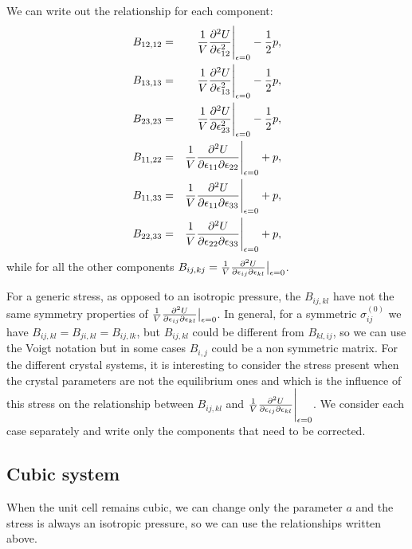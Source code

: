 \documentclass[12pt,a4paper,twoside]{report}
\begin{document}
We can write out the relationship for each component: 
\begin{eqnarray}
B_{12,12} &=& {1 \over V}{\partial^2 U \over \partial \epsilon^2_{12}}\Bigg|_{\epsilon=0} - {1\over 2} p, \\
B_{13,13} &=& {1 \over V}{\partial^2 U \over \partial \epsilon^2_{13} 
}\Bigg|_{\epsilon=0} - {1\over 2} p, \\
B_{23,23} &=& {1 \over V}{\partial^2 U \over \partial \epsilon^2_{23} 
}\Bigg|_{\epsilon=0} - {1\over 2} p, \\
B_{11,22} &=& {1 \over V}{\partial^2 U \over \partial \epsilon_{11} 
\partial \epsilon_{22}}\Bigg|_{\epsilon=0} + p, \\
B_{11,33} &=& {1 \over V}{\partial^2 U \over \partial \epsilon_{11} 
\partial \epsilon_{33}}\Bigg|_{\epsilon=0} + p, \\
B_{22,33} &=& {1 \over V}{\partial^2 U \over \partial \epsilon_{22} 
\partial \epsilon_{33}}\Bigg|_{\epsilon=0} + p, 
\end{eqnarray}
while for all the other components $B_{ij,kj}=
{1 \over V}{\partial^2 U \over \partial \epsilon_{ij} 
\partial \epsilon_{kl}}\big|_{\epsilon=0}$.

For a generic stress, as opposed to an isotropic pressure, the $B_{ij,kl}$ 
have not the same symmetry properties of ${1 \over V}{\partial^2 U \over 
\partial \epsilon_{ij} 
\partial \epsilon_{kl}}\big|_{\epsilon=0}$. In general, for a 
symmetric $\sigma^{(0)}_{ij}$ we have $B_{ij,kl}=B_{ji,kl}=B_{ij,lk}$,
but $B_{ij,kl}$ could be different from $B_{kl,ij}$, so we can use
the Voigt notation but in some cases $B_{i,j}$ could be a non symmetric
matrix.
For the different crystal systems, it is interesting to consider 
the stress present when the crystal parameters are not the equilibrium ones
and which is the influence of this stress on the relationship between 
$B_{ij,kl}$ and 
${1 \over V}{\partial^2 U \over \partial \epsilon_{ij} 
\partial \epsilon_{kl}}\Bigg|_{\epsilon=0}$. We consider each case
separately and write only the components that need to be corrected.

{\color{web-blue}\subsection{Cubic system}}
\color{black}

When the unit cell remains cubic, we can change only the parameter 
$a$ and the stress is always an isotropic pressure, so we can use the 
relationships written above.
\end{document}
